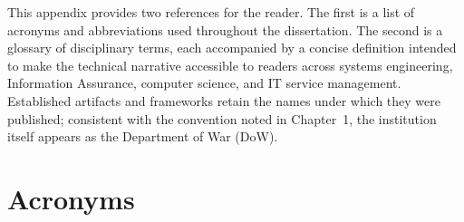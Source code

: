 

\label{appendix:acronyms-terms}

This appendix provides two references for the reader. The first is a list of acronyms and abbreviations used throughout the dissertation. The second is a glossary of disciplinary terms, each accompanied by a concise definition intended to make the technical narrative accessible to readers across systems engineering, Information Assurance, computer science, and IT service management. Established artifacts and frameworks retain the names under which they were published; consistent with the convention noted in Chapter~1, the institution itself appears as the Department of War (DoW).

\section{Acronyms}

